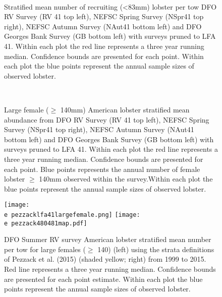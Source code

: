 \documentclass[11pt]{article}
\newcommand{\e}{/backup/bio_data/bio.lobster/figures/} %
\begin{document}
\begin{figure}
\centering
{}
\\

\caption{Stratified mean number of recruiting (\textless 83mm) lobster per tow DFO RV Survey (RV 41 top left), NEFSC Spring Survey (NSpr41 top right), NEFSC Autumn Survey (NAut41 bottom left) and DFO Georges Bank Survey (GB bottom left) with surveys pruned to LFA 41. Within each plot the red line represents a three year running median. Confidence bounds are presented for each point. Within each plot the blue points represent the annual sample sizes of observed lobster. }
\end{figure}
\clearpage





\begin{figure}
\centering
{}
\\

\caption{Large female ($\geq$ 140mm) American lobster stratified mean abundance from DFO RV Survey (RV 41 top left), NEFSC Spring Survey (NSpr41 top right), NEFSC Autumn Survey (NAut41 bottom left) and DFO Georges Bank Survey (GB bottom left) with surveys pruned to LFA 41. Within each plot the red line represents a three year running median. Confidence bounds are presented for each point.  Blue points represents the annual number of female lobster $\geq$ 140mm observed within the survey.Within each plot the blue points represent the annual sample sizes of observed lobster.}
\end{figure}
\clearpage


\begin{landscape}
\begin{figure}
\centering
    \texttt{[image: \\e pezzacklfa41largefemale.png]} 
    \texttt{[image: \\e pezzack480481map.pdf]} 
    
    \caption{DFO Summer RV survey American lobster stratified mean number per tow for large females ($\geq$ 140) (left) using the strata definitions of Pezzack et al. (2015) (shaded yellow; right) from 1999 to 2015. Red line represents a three year running median. Confidence bounds are presented for each point estimate. Within each plot the blue points represent the annual sample sizes of observed lobster.}

\end{figure}
\end{landscape}
\end{document}
